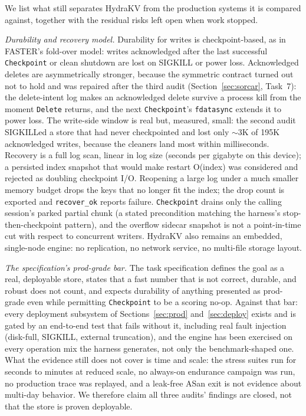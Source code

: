 \documentclass{article}
\begin{document}
We list what still separates HydraKV from the production systems it is compared against, together with the residual risks left open when work stopped.

\emph{Durability and recovery model.} Durability for writes is checkpoint-based, as in FASTER's fold-over model: writes acknowledged after the last successful \texttt{Checkpoint} or clean shutdown are lost on SIGKILL or power loss. Acknowledged deletes are asymmetrically stronger, because the symmetric contract turned out not to hold and was repaired after the third audit (Section~\ref{sec:sorcar}, Task~7): the delete-intent log makes an acknowledged delete survive a process kill from the moment \texttt{Delete} returns, and the next \texttt{Checkpoint}'s \texttt{fdatasync} extends it to power loss. The write-side window is real but, measured, small: the second audit SIGKILLed a store that had never checkpointed and lost only $\sim$3K of 195K acknowledged writes, because the cleaners land most within milliseconds. Recovery is a full log scan, linear in log size (seconds per gigabyte on this device); a persisted index snapshot that would make restart O(index) was considered and rejected as doubling checkpoint I/O. Reopening a large log under a much smaller memory budget drops the keys that no longer fit the index; the drop count is exported and \texttt{recover\_ok} reports failure. \texttt{Checkpoint} drains only the calling session's parked partial chunk (a stated precondition matching the harness's stop-then-checkpoint pattern), and the overflow sidecar snapshot is not a point-in-time cut with respect to concurrent writers. HydraKV also remains an embedded, single-node engine: no replication, no network service, no multi-file storage layout.

\emph{The specification's prod-grade bar.} The task specification defines the goal as a real, deployable store, states that a fast number that is not correct, durable, and robust does not count, and expects durability of anything presented as prod-grade even while permitting \texttt{Checkpoint} to be a scoring no-op. Against that bar: every deployment subsystem of Sections~\ref{sec:prod} and~\ref{sec:deploy} exists and is gated by an end-to-end test that fails without it, including real fault injection (disk-full, SIGKILL, external truncation), and the engine has been exercised on every operation mix the harness generates, not only the benchmark-shaped one. What the evidence still does not cover is time and scale: the stress suites run for seconds to minutes at reduced scale, no always-on endurance campaign was run, no production trace was replayed, and a leak-free ASan exit is not evidence about multi-day behavior. We therefore claim all three audits' findings are closed, not that the store is proven deployable.
\end{document}

